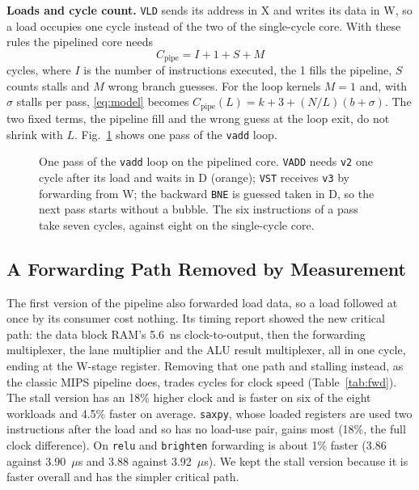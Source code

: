 \textbf{Loads and cycle count.} \texttt{VLD} sends its address in X and writes its data in
W, so a load occupies one cycle instead of the two of the single-cycle core. With these
rules the pipelined core needs
\begin{equation}
C_{\mathrm{pipe}} = I + 1 + S + M
\label{eq:pipe}
\end{equation}
cycles, where $I$ is the number of instructions executed, the 1 fills the pipeline, $S$
counts stalls and $M$ wrong branch guesses. For the loop kernels $M = 1$ and, with
$\sigma$ stalls per pass, \eqref{eq:model} becomes
$C_{\mathrm{pipe}}(L) = k + 3 + (N/L)(b + \sigma)$. The two fixed terms, the pipeline
fill and the wrong guess at the loop exit, do not shrink with $L$. Fig.~\ref{fig:ptiming}
shows one pass of the \texttt{vadd} loop.

\begin{figure}[t]
\centering

\caption{One pass of the \texttt{vadd} loop on the pipelined core. \texttt{VADD} needs
\texttt{v2} one cycle after its load and waits in D (orange); \texttt{VST} receives
\texttt{v3} by forwarding from W; the backward \texttt{BNE} is guessed taken in D, so the
next pass starts without a bubble. The six instructions of a pass take seven cycles,
against eight on the single-cycle core.}
\label{fig:ptiming}
\end{figure}

\subsection{A Forwarding Path Removed by Measurement}\label{sec:fwdload}
The first version of the pipeline also forwarded load data, so a load followed at once
by its consumer cost nothing. Its timing report showed the new critical path: the data
block RAM's 5.6~ns clock-to-output, then the forwarding multiplexer, the lane multiplier
and the ALU result multiplexer, all in one cycle, ending at the W-stage register.
Removing that one path and stalling instead, as the classic MIPS pipeline does, trades
cycles for clock speed (Table~\ref{tab:fwd}). The stall version has an 18\% higher clock
and is faster on six of the eight workloads and 4.5\% faster on average. \texttt{saxpy},
whose loaded registers are used two instructions after the load and so has no
load-use pair, gains most (18\%, the full clock difference). On \texttt{relu} and
\texttt{brighten} forwarding is about 1\% faster (3.86 against 3.90~$\mu$s and 3.88
against 3.92~$\mu$s). We kept the stall version because it is faster overall and has the
simpler critical path.

